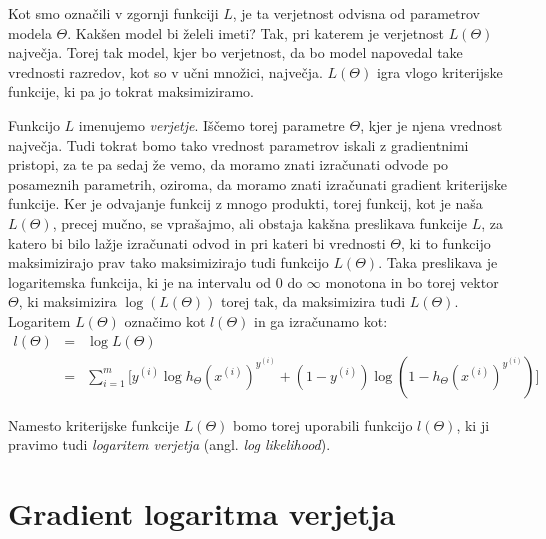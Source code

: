 Kot smo označili v zgornji funkciji $L$, je ta verjetnost odvisna od parametrov modela $\Theta$. Kakšen model bi želeli imeti? Tak, pri katerem je verjetnost $L(\Theta)$ največja. Torej tak model, kjer bo verjetnost, da bo model napovedal take vrednosti razredov, kot so v učni množici, največja. $L(\Theta)$ igra vlogo kriterijske funkcije, ki pa jo tokrat maksimiziramo.

Funkcijo $L$ imenujemo {\em verjetje}. Iščemo torej parametre $\Theta$, kjer je njena vrednost največja. Tudi tokrat bomo tako vrednost parametrov iskali z gradientnimi pristopi, za te pa sedaj že vemo, da moramo znati izračunati odvode po posameznih parametrih, oziroma, da moramo znati izračunati gradient kriterijske funkcije. Ker je odvajanje funkcij z mnogo produkti, torej funkcij, kot je naša $L(\Theta)$, precej mučno, se vprašajmo, ali obstaja kakšna preslikava funkcije $L$, za katero bi bilo lažje izračunati odvod in pri kateri bi vrednosti $\Theta$, ki to funkcijo maksimizirajo prav tako maksimizirajo tudi funkcijo $L(\Theta)$. Taka preslikava je logaritemska funkcija, ki je na intervalu od 0 do $\infty$ monotona in bo torej vektor $\Theta$, ki maksimizira $\log(L(\Theta))$ torej tak, da maksimizira tudi $L(\Theta)$. Logaritem $L(\Theta)$ označimo kot $l(\Theta)$ in ga izračunamo kot:
\begin{eqnarray}
  l(\Theta) & = & \log L(\Theta) \nonumber\\
  & = & \sum_{i=1}^m\big[y^{(i)}\log h_\Theta(x^{(i)})^{y^{(i)}}+(1-y^{(i)})\log (1-h_\Theta(x^{(i)})^{y^{(i)}}) \big]
\end{eqnarray}

Namesto kriterijske funkcije $L(\Theta)$ bomo torej uporabili funkcijo $l(\Theta)$, ki ji pravimo tudi {\em logaritem verjetja} (angl. {\em log likelihood}).

\section{Gradient logaritma verjetja}

